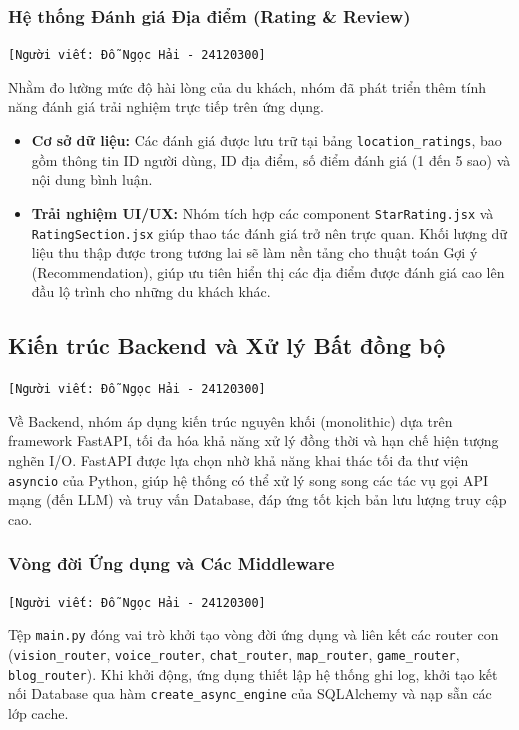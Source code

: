 \subsubsection{Hệ thống Đánh giá Địa điểm (Rating \& Review)}
\texttt{[Người viết: Đỗ Ngọc Hải - 24120300]}

Nhằm đo lường mức độ hài lòng của du khách, nhóm đã phát triển thêm tính năng đánh giá trải nghiệm trực tiếp trên ứng dụng.
\begin{itemize}
    \item \textbf{Cơ sở dữ liệu:} Các đánh giá được lưu trữ tại bảng \texttt{location\_ratings}, bao gồm thông tin ID người dùng, ID địa điểm, số điểm đánh giá (1 đến 5 sao) và nội dung bình luận.
    \item \textbf{Trải nghiệm UI/UX:} Nhóm tích hợp các component \texttt{StarRating.jsx} và \texttt{RatingSection.jsx} giúp thao tác đánh giá trở nên trực quan. Khối lượng dữ liệu thu thập được trong tương lai sẽ làm nền tảng cho thuật toán Gợi ý (Recommendation), giúp ưu tiên hiển thị các địa điểm được đánh giá cao lên đầu lộ trình cho những du khách khác.
\end{itemize}


\subsection{Kiến trúc Backend và Xử lý Bất đồng bộ}
\texttt{[Người viết: Đỗ Ngọc Hải - 24120300]}

Về Backend, nhóm áp dụng kiến trúc nguyên khối (monolithic) dựa trên framework FastAPI, tối đa hóa khả năng xử lý đồng thời và hạn chế hiện tượng nghẽn I/O. FastAPI được lựa chọn nhờ khả năng khai thác tối đa thư viện \texttt{asyncio} của Python, giúp hệ thống có thể xử lý song song các tác vụ gọi API mạng (đến LLM) và truy vấn Database, đáp ứng tốt kịch bản lưu lượng truy cập cao.

\subsubsection{Vòng đời Ứng dụng và Các Middleware}
\texttt{[Người viết: Đỗ Ngọc Hải - 24120300]}

Tệp \texttt{main.py} đóng vai trò khởi tạo vòng đời ứng dụng và liên kết các router con (\texttt{vision\_router}, \texttt{voice\_router}, \texttt{chat\_router}, \texttt{map\_router}, \texttt{game\_router}, \texttt{blog\_router}). Khi khởi động, ứng dụng thiết lập hệ thống ghi log, khởi tạo kết nối Database qua hàm \texttt{create\_async\_engine} của SQLAlchemy và nạp sẵn các lớp cache.

